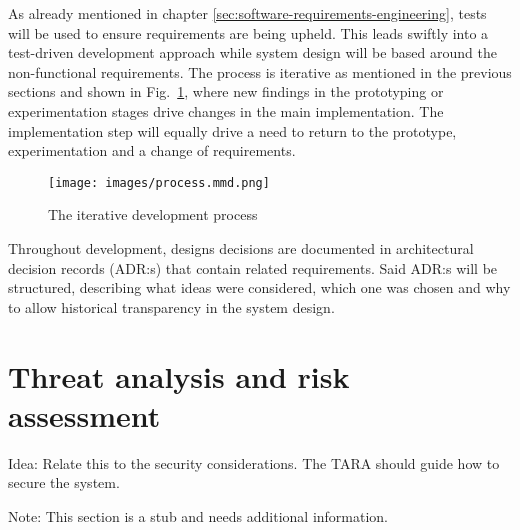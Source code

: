 As already mentioned in chapter \ref{sec:software-requirements-engineering},
tests will be used to ensure requirements are being upheld. This
leads swiftly into a test-driven development approach \cite[242-245]{sommerville-software-engineering}
while system design will be based around the non-functional
requirements. The process is iterative as mentioned in the previous
sections and shown in Fig.~\ref{fig:process-diagram}, where new
findings in the prototyping or experimentation stages drive changes
in the main implementation. The implementation step will equally
drive a need to return to the prototype, experimentation and a change
of requirements.

\begin{figure}[ht]
    \centering
	\texttt{[image: images/process.mmd.png]}
	\caption{The iterative development process}
	\label{fig:process-diagram}
\end{figure}

Throughout development, designs decisions are documented in
architectural decision records (ADR:s) \cite{adr, adr-github} that
contain related requirements. Said ADR:s will be structured,
describing what ideas were considered, which one was chosen and why
to allow historical transparency in the system design.

\section{Threat analysis and risk assessment}

Idea: Relate this to the security considerations. The TARA should
guide how to secure the system.

Note: This section is a stub and needs additional information.
